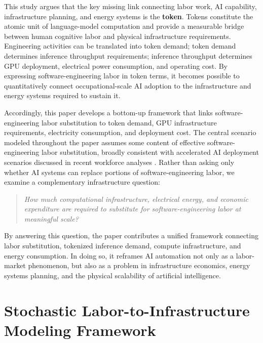 \documentclass{article}
\begin{document}
This study argues that the key missing link connecting labor work, AI capability, infrastructure planning, and energy systems is the \textbf{token}. Tokens constitute the atomic unit of language-model computation and provide a measurable bridge between human cognitive labor and physical infrastructure requirements. Engineering activities can be translated into token demand; token demand determines inference throughput requirements; inference throughput determines GPU deployment, electrical power consumption, and operating cost. By expressing software-engineering labor in token terms, it becomes possible to quantitatively connect occupational-scale AI adoption to the infrastructure and energy systems required to sustain it.

Accordingly, this paper develops a bottom-up framework that links software-engineering labor substitution to token demand, GPU infrastructure requirements, electricity consumption, and deployment cost. The central scenario modeled throughout the paper assumes some content of effective software-engineering labor substitution, broadly consistent with accelerated AI deployment scenarios discussed in recent workforce analyses \citep{mckinsey2024future}. Rather than asking only whether AI systems can replace portions of software-engineering labor, we examine a complementary infrastructure question:

\begin{quote}
\textit{How much computational infrastructure, electrical energy, and economic expenditure are required to substitute for software-engineering labor at meaningful scale?}
\end{quote}

By answering this question, the paper contributes a unified framework connecting labor substitution, tokenized inference demand, compute infrastructure, and energy consumption. In doing so, it reframes AI automation not only as a labor-market phenomenon, but also as a problem in infrastructure economics, energy systems planning, and the physical scalability of artificial intelligence.



\section{Stochastic Labor-to-Infrastructure Modeling Framework}
\label{sec:Modeling}
\end{document}
